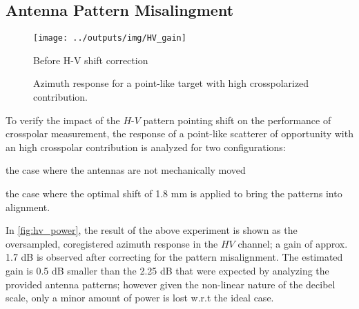 \subsection{Antenna Pattern Misalingment}
\begin{figure}[ht!]
	\centering
	\texttt{[image: ../outputs/img/HV\_gain]}
	\caption{Before H-V shift correction}
	\label{fig:hv_power:uncalibrated}
	\caption{Azimuth response for a point-like target with high crosspolarized contribution.}
	\label{fig:hv_power}
\end{figure}
To verify the impact of the $H$-$V$ pattern pointing shift on the performance of crosspolar measurement, the response of a point-like scatterer of opportunity with an high crosspolar contribution is analyzed for two configurations: \begin{enumerate*}\item the case where the antennas are not mechanically moved \item the case where the optimal shift of 1.8 mm is applied to bring the patterns into alignment.
\end{enumerate*}
In \autoref{fig:hv_power}, the result of the above experiment is shown as the oversampled, coregistered azimuth response in the $HV$ channel; a gain of approx. 1.7 dB is observed after correcting for the pattern misalignment. The estimated gain is 0.5 dB smaller than the 2.25 dB that were expected by analyzing the provided antenna patterns; however given the non-linear nature of the decibel scale, only a minor amount of power is lost w.r.t the ideal case.  
